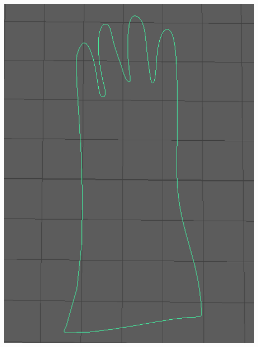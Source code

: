 \documentclass[a4paper, openright, twoside]{book}
\begin{document}
\begin{minipage}{\textwidth}\label{gloves}
\begin{center}
    \centering
    \begin{minipage}{0.18\textwidth}
        \centering
        \includegraphics[width=1\textwidth]{images/curve.png}
    \end{minipage}\hfill
    \begin{minipage}{0.18\textwidth}
        \centering

\end{minipage}
\end{center}
\end{minipage}
\end{document}
